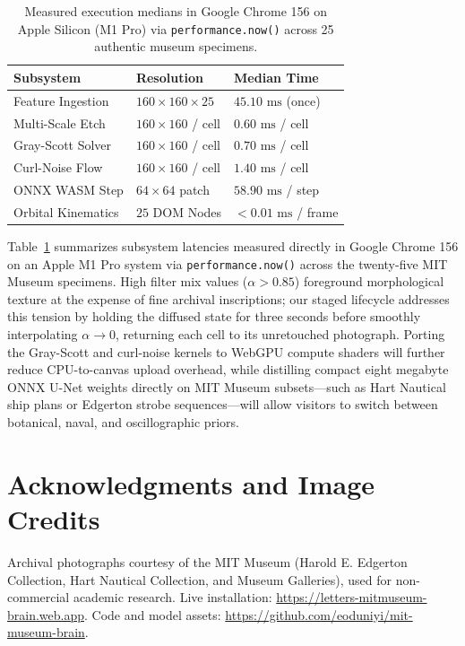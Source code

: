 \documentclass[journal,compsoc]{IEEEtran}
\begin{document}
\begin{table}[t]
\centering
\caption{Measured execution medians in Google Chrome 156 on Apple Silicon (M1 Pro) via \texttt{performance.now()} across 25 authentic museum specimens.}
\label{tab:benchmarks}
\begin{tabular}{@{}lll@{}}
\toprule
\textbf{Subsystem} & \textbf{Resolution} & \textbf{Median Time} \\
\midrule
Feature Ingestion & $160\times 160 \times 25$ & $45.10\text{ ms}$ (once) \\
Multi-Scale Etch & $160\times 160$ / cell & $0.60\text{ ms}$ / cell \\
Gray-Scott Solver & $160\times 160$ / cell & $0.70\text{ ms}$ / cell \\
Curl-Noise Flow & $160\times 160$ / cell & $1.40\text{ ms}$ / cell \\
ONNX WASM Step & $64\times 64$ patch & $58.90\text{ ms}$ / step \\
Orbital Kinematics & $25$ DOM Nodes & $< 0.01\text{ ms}$ / frame \\
\bottomrule
\end{tabular}
\end{table}

Table~\ref{tab:benchmarks} summarizes subsystem latencies measured directly in Google Chrome 156 on an Apple M1 Pro system via \texttt{performance.now()} across the twenty-five MIT Museum specimens. High filter mix values ($\alpha > 0.85$) foreground morphological texture at the expense of fine archival inscriptions; our staged lifecycle addresses this tension by holding the diffused state for three seconds before smoothly interpolating $\alpha \to 0$, returning each cell to its unretouched photograph. Porting the Gray-Scott and curl-noise kernels to WebGPU compute shaders will further reduce CPU-to-canvas upload overhead, while distilling compact eight megabyte ONNX U-Net weights directly on MIT Museum subsets---such as Hart Nautical ship plans or Edgerton strobe sequences---will allow visitors to switch between botanical, naval, and oscillographic priors.

\section*{Acknowledgments and Image Credits}
{\raggedright
Archival photographs courtesy of the MIT Museum (Harold E. Edgerton Collection, Hart Nautical Collection, and Museum Galleries), used for non-commercial academic research. Live installation: \url{https://letters-mitmuseum-brain.web.app}. Code and model assets: \url{https://github.com/eoduniyi/mit-museum-brain}.\par}
\end{document}
